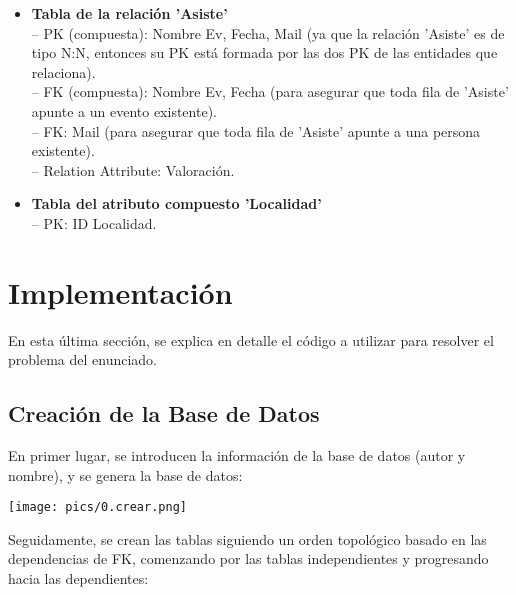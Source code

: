 \documentclass[12pt]{article}
\begin{document}
\begin{itemize}
        \item \textbf{Tabla de la relación 'Asiste'} \\
            -- PK (compuesta): Nombre Ev, Fecha, Mail (ya que la relación 'Asiste' es de tipo N:N, entonces su PK está formada por las dos PK de las 
            entidades que relaciona). \\
            -- FK (compuesta): Nombre Ev, Fecha (para asegurar que toda fila de 'Asiste' apunte a un evento existente). \\
            -- FK: Mail (para asegurar que toda fila de 'Asiste' apunte a una persona existente). \\
            -- Relation Attribute: Valoración.
            
        \item \textbf{Tabla del atributo compuesto 'Localidad'} \\
            -- PK: ID Localidad.

    \end{itemize}

    \newpage
    \section{Implementación}
    En esta última sección, se explica en detalle el código a utilizar para resolver el problema del enunciado. 
    
    \subsection{Creación de la Base de Datos}    
    En primer lugar, se introducen la información de la base de datos (autor y nombre), y se genera la base de datos:

    \begin{center}{\texttt{[image: pics/0.crear.png]}}\end{center} 

    Seguidamente, se crean las tablas siguiendo un orden topológico basado en las dependencias de FK, 
    comenzando por las tablas independientes y progresando hacia las dependientes:
    
\end{document}
